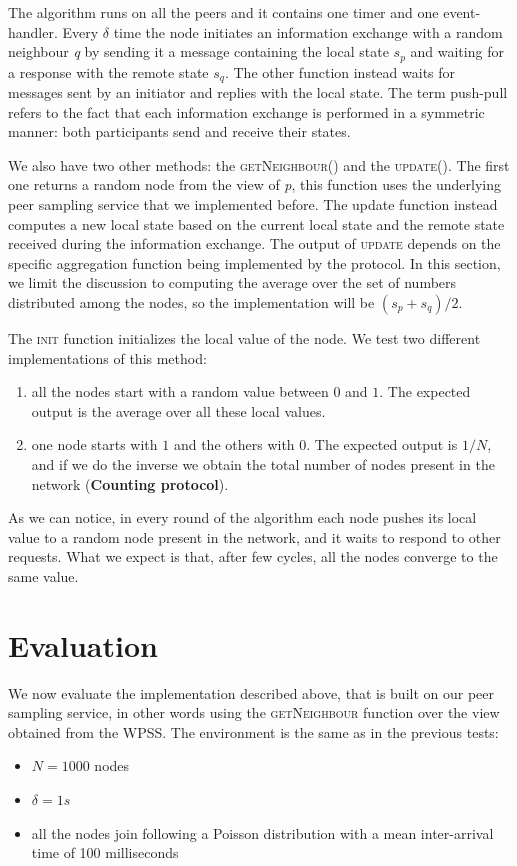 The algorithm runs on all the peers and it contains one timer and one event-handler. Every $\delta$ time the node initiates an information exchange with a random neighbour \textit{q} by sending it a message containing the local state $s_p$ and waiting for a response with the remote state $s_q$. The other function instead waits for messages sent by an initiator and replies with the local state. The term push-pull refers to the fact that each information exchange is performed in a symmetric manner: both participants send and receive their states.

We also have two other methods: the \textsc{getNeighbour()} and the \textsc{update()}. The first one returns a random node from the view of \textit{p}, this function uses the underlying peer sampling service that we implemented before. The update function instead computes a new local state based on the current local state and the remote state received during the information exchange. The output of \textsc{update} depends on the specific aggregation function being implemented by the protocol. In this section, we limit the discussion to computing the average over the set of numbers distributed among the nodes, so the implementation will be $(s_p + s_q) / 2$. 

The \textsc{init} function initializes the local value of the node. We test two different implementations of this method: 
\begin{enumerate}
	\item all the nodes start with a random value between $0$ and $1$. The expected output is the average over all these local values.
	\item one node starts with $1$ and the others with $0$. The expected output is $1/N$, and if we do the inverse we obtain the total number of nodes present in the network (\textbf{Counting protocol}).
\end{enumerate}

As we can notice, in every round of the algorithm each node pushes its local value to a random node present in the network, and it waits to respond to other requests. What we expect is that, after few cycles, all the nodes converge to the same value. 

\section{Evaluation}
\label{sec:evaluation_aggregation}
We now evaluate the implementation described above, that is built on our peer sampling service, in other words using the \textsc{getNeighbour} function over the view obtained from the WPSS. The environment is the same as in the previous tests:
\begin{itemize}
	\item $N = 1000$ nodes
	\item $\delta = 1s$
	\item all the nodes join following a Poisson distribution with a mean inter-arrival time of 100 milliseconds
\end{itemize}

